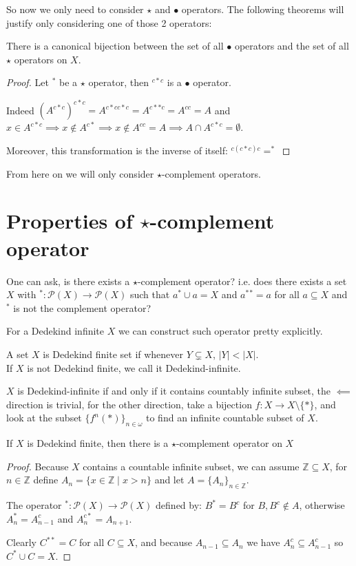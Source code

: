 	So now we only need to consider $\star$ and $\bullet$ operators. The following theorems will justify only considering one of those 2 operators:
	
	\begin{theorem}\label{thm:1.5}
		There is a canonical bijection between the set of all $\bullet$ operators and the set of all $\star$ operators on $X$.
	\end{theorem}
	\begin{proof}
		Let $^*$ be a $\star$ operator, then $^{c*c}$ is a $\bullet$ operator.
		
		
		 Indeed $(A^{c*c})^{c*c}=A^{c*cc*c}=A^{c**c}=A^{cc}=A$ and $x\in A^{c*c}\implies x \notin A^{c*}\implies x \notin A^{cc}=A\implies A\cap A^{c*c}=\emptyset$.
		
		Moreover, this transformation is the inverse of itself: $^{c(c*c)c}=^*$	
	\end{proof}
	From here on we will only consider $\star$-complement operators.
	
	\section{Properties of $\star$-complement operator}
	One can ask, is there exists a $\star$-complement operator? i.e. does there exists a set $X$ with $^*:\mathcal{P}(X)\to\mathcal{P}(X)$ such that $a^*\cup a=X$ and $a^*{}^*=a$ for all $a\subseteq X$ and $^*$ is not the complement operator?
	
	For a Dedekind infinite $X$ we can construct such operator pretty explicitly.
	
	\begin{definition}
		A set $X$ is Dedekind finite set if whenever $Y\subsetneq X$, $|Y|<|X|$.\\
		If $X$ is not Dedekind finite, we call it Dedekind-infinite.
	\end{definition}
	$X$ is Dedekind-infinite if and only if it contains countably infinite subset, the $\impliedby$ direction is trivial, for the other direction, take a bijection $f:X\to X\setminus\{*\}$, and look at the subset $\{f^n(*)\}_{n\in\omega}$ to find an infinite countable subset of $X$.
	
	\begin{lemma}\label{lem:2.2}
		If $X$ is Dedekind finite, then there is a $\star$-complement operator on $X$
	\end{lemma}
	\begin{proof}
		Because $X$ contains a countable infinite subset, we can assume $\mathbb Z\subseteq X$, for $n\in\mathbb Z$ define $A_n=\{x\in\mathbb Z\mid x>n\}$ and let $A=\{A_n\}_{n\in\mathbb Z}$.
		
		The operator $^*:\mathcal P(X)\to\mathcal P(X)$ defined by: $B^*=B^c$ for $B,B^c\notin A$, otherwise $A_n^*=A_{n-1}^c$ and $A_n^{c*}=A_{n+1}$.
		
		Clearly $C^{**}=C$ for all $C\subseteq X$, and because $A_{n-1}\subseteq A_n$ we have $A_n^c\subseteq A_{n-1}^c$ so $C^*\cup C=X$.
	\end{proof}
	
